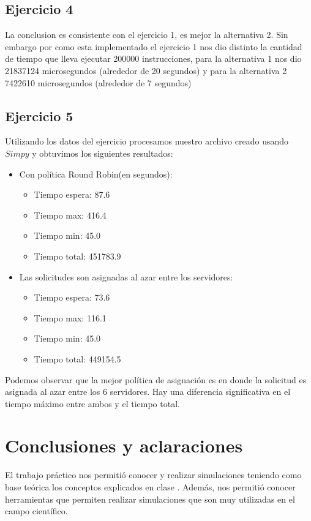 \documentclass[11pt,a4paper]{article}
\begin{document}
		

	\subsection{Ejercicio 4}
		La conclusion es consistente con el ejercicio 1, es mejor la alternativa 2. Sin embargo por como esta implementado el ejercicio 1 nos dio distinto la cantidad de tiempo que lleva ejecutar 200000 instrucciones, para la alternativa 1 nos dio  21837124 microsegundos (alrededor de 20 segundos) y para la alternativa 2  7422610 microsegundos (alrededor de 7 segundos)
	\subsection{Ejercicio 5}
		Utilizando los datos del ejercicio procesamos nuestro archivo creado usando $Simpy$ y obtuvimos los siguientes resultados:
		\begin{itemize}
			\item Con política Round Robin(en segundos):
				\begin{itemize}
					\item Tiempo espera: 87.6
					\item Tiempo max: 416.4
					\item Tiempo min: 45.0
					\item Tiempo total: 451783.9
				\end{itemize}
			\item Las solicitudes son asignadas al azar entre los servidores:
				\begin{itemize}
					\item Tiempo espera: 73.6
					\item Tiempo max: 116.1
					\item Tiempo min: 45.0
					\item Tiempo total: 449154.5
				\end{itemize}
		\end{itemize}

		Podemos observar que la mejor política de asignación es en donde la solicitud es asignada al azar entre los 6 servidores. Hay una diferencia significativa en el tiempo máximo entre ambos y el tiempo total.

\section{Conclusiones y aclaraciones}
El trabajo práctico nos permitió conocer y realizar simulaciones teniendo como base teórica los conceptos explicados en clase . Además, nos permitió conocer herramientas que permiten realizar simulaciones que son muy utilizadas en el campo científico.
\end{document}
